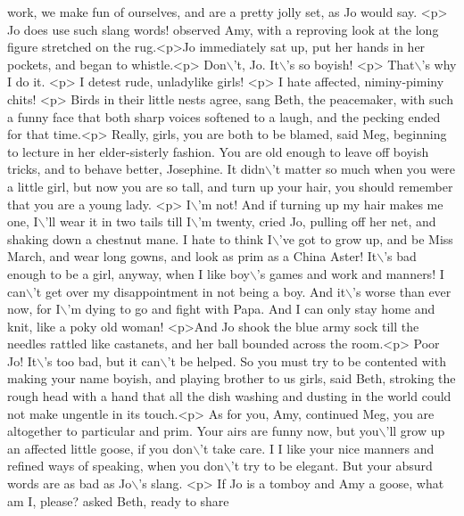 \begin{DoxyCode}
{       work, we make fun of ourselves, and are a pretty jolly set, as Jo would say. <p> Jo does use such slang words!
         observed Amy, with a reproving look at the long figure stretched on the rug.<p>Jo immediately sat up, put
       her hands in her pockets, and began to whistle.<p> Don\(\backslash\)'t, Jo. It\(\backslash\)'s so boyish! <p> That\(\backslash\)'s why I do it.
       <p> I detest rude, unladylike girls! <p> I hate affected, niminy-piminy chits! <p> Birds in their little nests
       agree,  sang Beth, the peacemaker, with such a funny face that both sharp voices softened to a laugh, and
       the  pecking  ended for that time.<p> Really, girls, you are both to be blamed,  said Meg, beginning to
       lecture in her elder-sisterly fashion. You are old enough to leave off boyish tricks, and to behave better,
       Josephine. It didn\(\backslash\)'t matter so much when you were a little girl, but now you are so tall, and turn up your hair,
       you should remember that you are a young lady. <p> I\(\backslash\)'m not!  And if turning up my hair makes me one, I\(\backslash\)'ll
       wear it in two tails till I\(\backslash\)'m twenty,  cried Jo, pulling off her net, and shaking down a chestnut mane.  
       I hate to think I\(\backslash\)'ve got to grow up, and be Miss March, and wear long gowns, and look as prim as a China
       Aster! It\(\backslash\)'s bad enough to be a girl, anyway, when I like boy\(\backslash\)'s games and work and manners! I can\(\backslash\)'t get over
       my disappointment in not being a boy. And it\(\backslash\)'s worse than ever now, for I\(\backslash\)'m dying to go and fight with
       Papa. And I can only stay home and knit, like a poky old woman! <p>And Jo shook the blue army sock till the
       needles rattled like castanets, and her ball bounded across the room.<p> Poor Jo! It\(\backslash\)'s too bad, but it can\(\backslash\)'t
       be helped. So you must try to be contented with making your name boyish, and playing brother to us girls, 
       said Beth, stroking the rough head with a hand that all the dish washing and dusting in the world could not
       make ungentle in its touch.<p> As for you, Amy,  continued Meg,  you are altogether to particular and prim.
       Your airs are funny now, but you\(\backslash\)'ll grow up an affected little goose, if you don\(\backslash\)'t take care. I I like
       your nice manners and refined ways of speaking, when you don\(\backslash\)'t try to be elegant. But your absurd words are as
       bad as Jo\(\backslash\)'s slang. <p> If Jo is a tomboy and Amy a goose, what am I, please?  asked Beth, ready to share
}
\end{DoxyCode}
